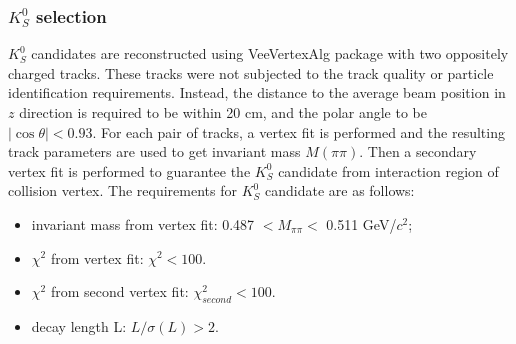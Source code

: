 \documentclass[aps,preprint,tightenlines,superscriptaddress,showpacs,byrevtex,amsmath,amssymb,nofloatfix]{revtex4}
\begin{document}
\subsubsection{$K^{0}_{S}$ selection}

$K^{0}_{S}$ candidates are reconstructed using VeeVertexAlg package with two oppositely charged tracks. These tracks were not subjected to the track quality or particle identification requirements. Instead, the distance to the average beam position in $z$ direction is required to be within 20 cm, and the polar angle to be $|\cos\theta|<0.93$. For each pair of tracks, a vertex fit is performed and the resulting track parameters are used to get invariant mass $M(\pi\pi)$.   Then a secondary vertex fit is performed to guarantee the $K^{0}_{S}$ candidate from interaction region of collision vertex.  The requirements for $K^{0}_{S}$ candidate are as follows:
\begin{itemize}
  \item invariant mass from vertex fit: 0.487 $< M_{\pi\pi} <$ 0.511 GeV/$c^{2}$;
  \item $\chi^{2}$ from vertex fit: $\chi^{2} < 100$.
  \item $\chi^{2}$ from second vertex fit: $\chi^{2}_{second} < 100$.
  \item decay length L: $L/\sigma(L)> 2$.
\end{itemize}

\end{document}
